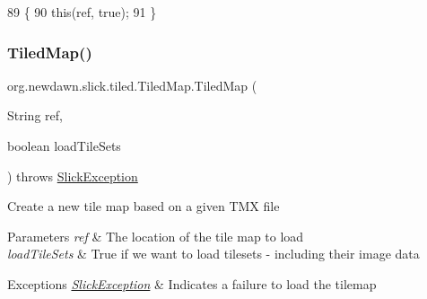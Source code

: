 \begin{DoxyCode}
89                                                       \{
90         \textcolor{keyword}{this}(ref, \textcolor{keyword}{true});
91     \}
\end{DoxyCode}
\mbox{\label{classorg_1_1newdawn_1_1slick_1_1tiled_1_1_tiled_map_a288b9b24c3f96803f9aa813516e540f5}} 
\subsubsection{\texorpdfstring{Tiled\+Map()}{TiledMap()}\hspace{0.1cm}{\footnotesize\ttfamily [2/5]}}
{\footnotesize\ttfamily org.\+newdawn.\+slick.\+tiled.\+Tiled\+Map.\+Tiled\+Map (\begin{DoxyParamCaption}\item[{String}]{ref,  }\item[{boolean}]{load\+Tile\+Sets }\end{DoxyParamCaption}) throws \mbox{\hyperlink{classorg_1_1newdawn_1_1slick_1_1_slick_exception}{Slick\+Exception}}\hspace{0.3cm}{\ttfamily [inline]}}

Create a new tile map based on a given T\+MX file


\begin{DoxyParams}{Parameters}
{\em ref} & The location of the tile map to load \\
\hline
{\em load\+Tile\+Sets} & True if we want to load tilesets -\/ including their image data \\
\hline
\end{DoxyParams}

\begin{DoxyExceptions}{Exceptions}
{\em \mbox{\hyperlink{classorg_1_1newdawn_1_1slick_1_1_slick_exception}{Slick\+Exception}}} & Indicates a failure to load the tilemap \\
\hline
\end{DoxyExceptions}

